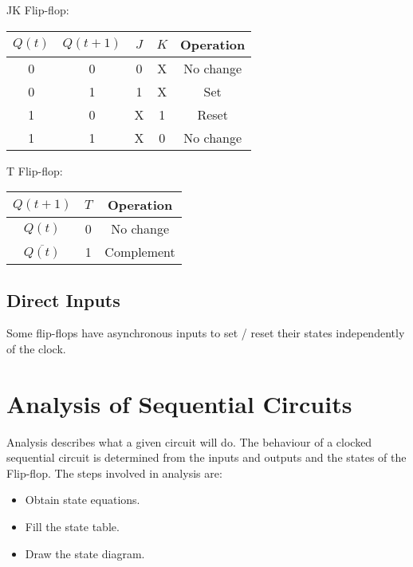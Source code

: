 \documentclass[12pt letter]{report}
\begin{document}
JK Flip-flop:
\begin{table}[H]
  \begin{center}
    \begin{tabular}{|c c|c c|c|}
      \hline
      $Q \left( t \right) $ & $Q \left( t + 1 \right) $ & $J$ & $K$ & Operation \\ [0.5ex]
      \hline
      \hline
      0                     & 0                         & 0   & X   & No change \\
      0                     & 1                         & 1   & X   & Set       \\
      1                     & 0                         & X   & 1   & Reset     \\
      1                     & 1                         & X   & 0   & No change \\
      \hline
    \end{tabular}
  \end{center}
\end{table}

T Flip-flop:
\begin{table}[h!]
  \begin{center}
    \begin{tabular}{|c|c|c|}
      \hline
      $Q \left( t + 1 \right) $        & $T$ & Operation  \\ [0.5ex]
      \hline
      \hline
      $Q \left( t \right) $            & 0   & No change  \\
      $\overline{Q \left( t \right) }$ & 1   & Complement \\
      \hline
    \end{tabular}
  \end{center}
\end{table}

\subsection{Direct Inputs}

Some flip-flops have asynchronous inputs to set / reset their states independently of the clock.

\section{Analysis of Sequential Circuits}

Analysis describes what a given circuit will do. The behaviour of a clocked sequential circuit is determined from the
inputs and outputs and the states of the Flip-flop. The steps involved in analysis are:
\begin{itemize}
  \item Obtain state equations.
  \item Fill the state table.
  \item Draw the state diagram.
\end{itemize}
\end{document}
